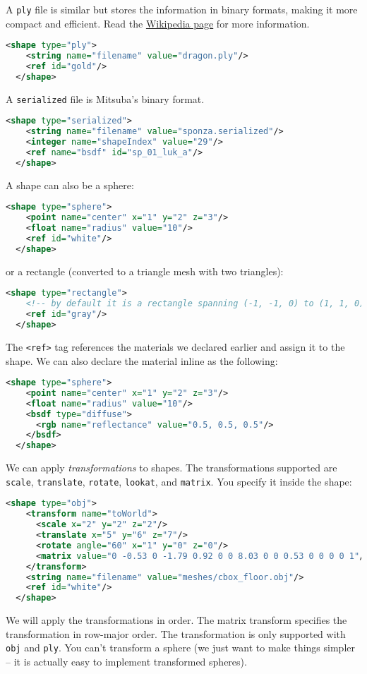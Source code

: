 A \lstinline{ply} file is similar but stores the information in binary formats, making it more compact and efficient. Read the \href{https://en.wikipedia.org/wiki/PLY_(file_format)}{Wikipedia page} for more information.
\begin{lstlisting}[language=xml]
  <shape type="ply">
    <string name="filename" value="dragon.ply"/>
    <ref id="gold"/>
  </shape>
\end{lstlisting}

A \lstinline{serialized} file is Mitsuba's binary format.
\begin{lstlisting}[language=xml]
  <shape type="serialized">
    <string name="filename" value="sponza.serialized"/>
    <integer name="shapeIndex" value="29"/>
    <ref name="bsdf" id="sp_01_luk_a"/>
  </shape>
\end{lstlisting}

A shape can also be a sphere:
\begin{lstlisting}[language=xml]
  <shape type="sphere">
    <point name="center" x="1" y="2" z="3"/>
    <float name="radius" value="10"/>
    <ref id="white"/>
  </shape>
\end{lstlisting}
or a rectangle (converted to a triangle mesh with two triangles):
\begin{lstlisting}[language=xml]
  <shape type="rectangle">
    <!-- by default it is a rectangle spanning (-1, -1, 0) to (1, 1, 0) -->
    <ref id="gray"/>
  </shape>
\end{lstlisting}

The \lstinline{<ref>} tag references the materials we declared earlier and assign it to the shape. We can also declare the material inline as the following:
\begin{lstlisting}[language=xml]
  <shape type="sphere">
    <point name="center" x="1" y="2" z="3"/>
    <float name="radius" value="10"/>
    <bsdf type="diffuse">
      <rgb name="reflectance" value="0.5, 0.5, 0.5"/>
    </bsdf>
  </shape>
\end{lstlisting}

We can apply \emph{transformations} to shapes. The transformations supported are \lstinline{scale}, \lstinline{translate}, \lstinline{rotate}, \lstinline{lookat}, and \lstinline{matrix}. You specify it inside the shape:
\begin{lstlisting}[language=xml]
  <shape type="obj">
    <transform name="toWorld">
      <scale x="2" y="2" z="2"/>
      <translate x="5" y="6" z="7"/>
      <rotate angle="60" x="1" y="0" z="0"/>
      <matrix value="0 -0.53 0 -1.79 0.92 0 0 8.03 0 0 0.53 0 0 0 0 1"/>
    </transform>
    <string name="filename" value="meshes/cbox_floor.obj"/>
    <ref id="white"/>
  </shape>
\end{lstlisting}
We will apply the transformations in order. The matrix transform specifies the transformation in row-major order.
The transformation is only supported with \lstinline{obj} and \lstinline{ply}. You can't transform a sphere (we just want to make things simpler -- it is actually easy to implement transformed spheres).

